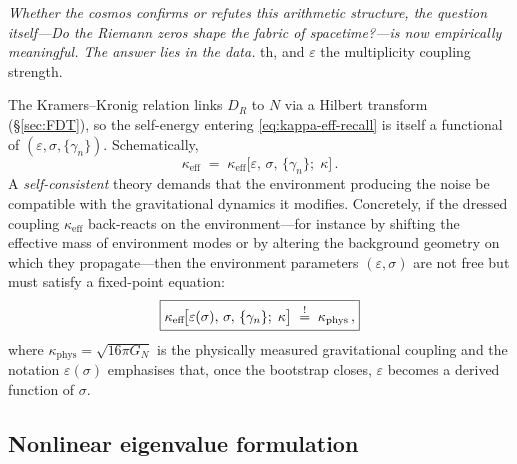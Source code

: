 \documentclass[12pt,a4paper]{article}
\begin{document}

\bigskip
\noindent
\emph{Whether the cosmos confirms or refutes this arithmetic
structure, the question itself---Do the Riemann zeros
shape the fabric of spacetime?---is now empirically
meaningful.
The answer lies in the data.}
th, and $\varepsilon$
the multiplicity coupling strength.

The Kramers--Kronig relation links $D_{R}$ to $N$ via
a Hilbert transform (\S\ref{sec:FDT}), so the self-energy entering
\eqref{eq:kappa-eff-recall} is itself a functional of
$(\varepsilon,\sigma,\{\gamma_{n}\})$.
Schematically,
%
\begin{equation}
  \kappa_{\mathrm{eff}}
  \;=\;
  \kappa_{\mathrm{eff}}\!\bigl[\varepsilon,\,\sigma,\,
  \{\gamma_{n}\};\;\kappa\bigr]\,.
  \label{eq:kappa-functional}
\end{equation}
%
A \emph{self-consistent} theory demands that the environment producing
the noise be compatible with the gravitational dynamics it modifies.
Concretely, if the dressed coupling $\kappa_{\mathrm{eff}}$ back-reacts
on the environment---for instance by shifting the effective mass of
environment modes or by altering the background geometry on which they
propagate---then the environment parameters $(\varepsilon,\sigma)$ are
not free but must satisfy a fixed-point equation:
%
\begin{equation}
\boxed{%
  \kappa_{\mathrm{eff}}\!\bigl[\varepsilon(\sigma),\,\sigma,\,
  \{\gamma_{n}\};\;\kappa\bigr]
  \;\stackrel{!}{=}\;
  \kappa_{\mathrm{phys}}\,,
}
  \label{eq:bootstrap-condition}
\end{equation}
%
where $\kappa_{\mathrm{phys}} = \sqrt{16\pi G_{N}}$ is the
physically measured gravitational coupling and the notation
$\varepsilon(\sigma)$ emphasises that, once the bootstrap
closes, $\varepsilon$ becomes a derived function of $\sigma$.


\subsection{Nonlinear eigenvalue formulation}
\label{subsec:nonlinear-eigenvalue}
\end{document}
